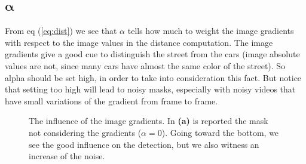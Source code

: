 \subsection*{$\bm{\alpha}$}
From eq (\ref{eq:dist}) we see that $\alpha$ tells how much to weight the image gradients
with respect to the image values in the distance computation.
The image gradients give a good cue to distinguish the street from the cars
(image absolute values are not, since many cars have almost the same color of the
street). So alpha should be set high, in order to take into consideration this fact.
But notice that setting too high will lead to noisy masks, especially with noisy
videos that have small variations of the gradient from frame to frame.
\begin{figure}[!t]
    \centering
    \newline
    \newline
    \newline
    \caption{The influence of the image gradients. In \textbf{(a)} is reported the mask not considering the gradients ($\alpha = 0$). Going toward the bottom, we see the good influence on the detection, but we also witness an increase of the noise.}
\end{figure}


